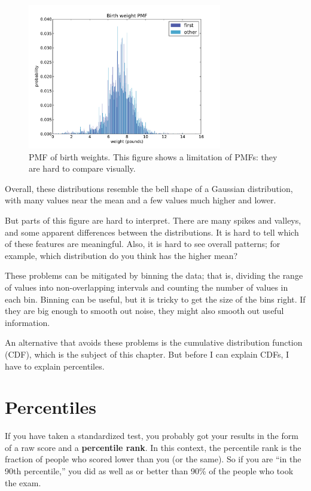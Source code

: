 \documentclass[12pt]{book}
\begin{document}
\begin{figure}
\centerline{\includegraphics[height=2.5in]{figs/nsfg_birthwgt_pmf.pdf}}
\caption{PMF of birth weights.  This figure shows a limitation
of PMFs: they are hard to compare visually.}
\label{nsfg_birthwgt_pmf}
\end{figure}

Overall, these distributions resemble the bell shape of a Gaussian
distribution, with many values near the mean and a few values much
higher and lower.

But parts of this figure are hard to interpret.  There are many spikes
and valleys, and some apparent differences between the distributions.
It is hard to tell which of these features are meaningful.  Also, it
is hard to see overall patterns; for example, which distribution do
you think has the higher mean?

These problems can be mitigated by binning the data; that is, dividing
the range of values into non-overlapping intervals and counting the
number of values in each bin.  Binning can be useful, but it is tricky
to get the size of the bins right.  If they are big enough to smooth
out noise, they might also smooth out useful information.

An alternative that avoids these problems is the cumulative
distribution function (CDF), which is the subject of this chapter.
But before I can explain CDFs, I have to explain percentiles.


\section{Percentiles}

If you have taken a standardized test, you probably got your
results in the form of a raw score and a {\bf percentile rank}.
In this context, the percentile rank is the fraction of people who
scored lower than you (or the same).  So if you are ``in the 90th
percentile,'' you did as well as or better than 90\% of the people who
took the exam.
\end{document}
